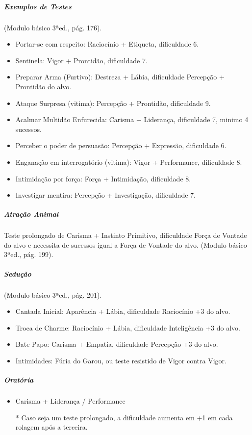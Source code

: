 

\begin{multicols}{2}

\subparagraph{\bf Exemplos de Testes} (Modulo básico 3ªed., pág. 176).

\begin{itemize}[noitemsep]
\item Portar-se com respeito: Raciocínio + Etiqueta, dificuldade 6.
\item Sentinela: Vigor + Prontidão, dificuldade 7.
\item Preparar Arma (Furtivo): Destreza + Lábia, dificuldade Percepção + Prontidão do alvo.
\item Ataque Surpresa (vitima): Percepção + Prontidão, dificuldade 9.
\item Acalmar Multidão Enfurecida: Carisma + Liderança, dificuldade 7, minimo 4 sucessos.
\item Perceber o poder de persuasão: Percepção + Expressão, dificuldade 6.
\item Enganação em interrogatório (vitima): Vigor + Performance, dificuldade 8.
\item Intimidação por força: Força + Intimidação, dificuldade 8.
\item Investigar mentira: Percepção + Investigação, dificuldade 7.
\end{itemize}

\subparagraph{\bf Atração Animal} Teste prolongado de Carisma + Instinto Primitivo, dificuldade Força de Vontade do alvo e necessita de sucessos igual a Força de Vontade do alvo. (Modulo básico 3ªed., pág. 199).

\subparagraph{\bf Sedução} (Modulo básico 3ªed., pág. 201).
\begin{itemize}[noitemsep]
\item Cantada Inicial: Aparência + Lábia, dificuldade Raciocínio +3 do alvo.
\item Troca de Charme: Raciocínio + Lábia, dificuldade Inteligência +3 do alvo.
\item Bate Papo: Carisma + Empatia, dificuldade Percepção +3 do alvo.
\item Intimidades: Fúria do Garou, ou teste resistido de Vigor contra Vigor.
\end{itemize}

\subparagraph{\bf Oratória}
\begin{itemize}[noitemsep]
\item Carisma + Liderança / Performance
\item[*] Caso seja um teste prolongado, a dificuldade aumenta em +1 em cada rolagem após a terceira.
\end{itemize}

\end{multicols}